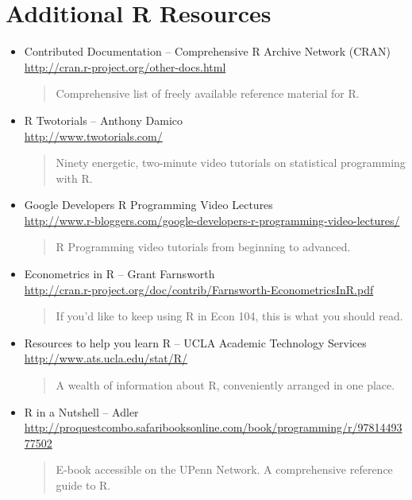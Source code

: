 \documentclass[11pt, letterpaper]{article}
\begin{document}
\section*{Additional R Resources} 
\begin{itemize}
		       \item Contributed Documentation -- Comprehensive R Archive Network (CRAN) \\\url{http://cran.r-project.org/other-docs.html}
           	\begin{quote}
           		Comprehensive list of freely available reference material for R.
           	\end{quote}
\item R Twotorials -- Anthony Damico \\\url{http://www.twotorials.com/}
		\begin{quote}
		Ninety energetic, two-minute video tutorials on statistical programming with R. 
		\end{quote}
			\item Google Developers R Programming Video Lectures\\ \url{http://www.r-bloggers.com/google-developers-r-programming-video-lectures/}\begin{quote}R Programming video tutorials from beginning to advanced. \end{quote}
		 	\item Econometrics in R -- Grant Farnsworth\\\url{http://cran.r-project.org/doc/contrib/Farnsworth-EconometricsInR.pdf}
 		\begin{quote}
 		If you'd like to keep using R in Econ 104, this is what you should read.
 		\end{quote}
 			\item Resources to help you learn R -- UCLA Academic Technology Services \\\url{http://www.ats.ucla.edu/stat/R/}
		\begin{quote}
			A wealth of information about R, conveniently arranged in one place.
		\end{quote}
	           \item R in a Nutshell -- Adler\\ \url{http://proquestcombo.safaribooksonline.com/book/programming/r/9781449377502}         
           	\begin{quote}
           		E-book accessible on the UPenn Network. A comprehensive reference guide to R.
           	\end{quote}
\end{itemize}
\end{document}
